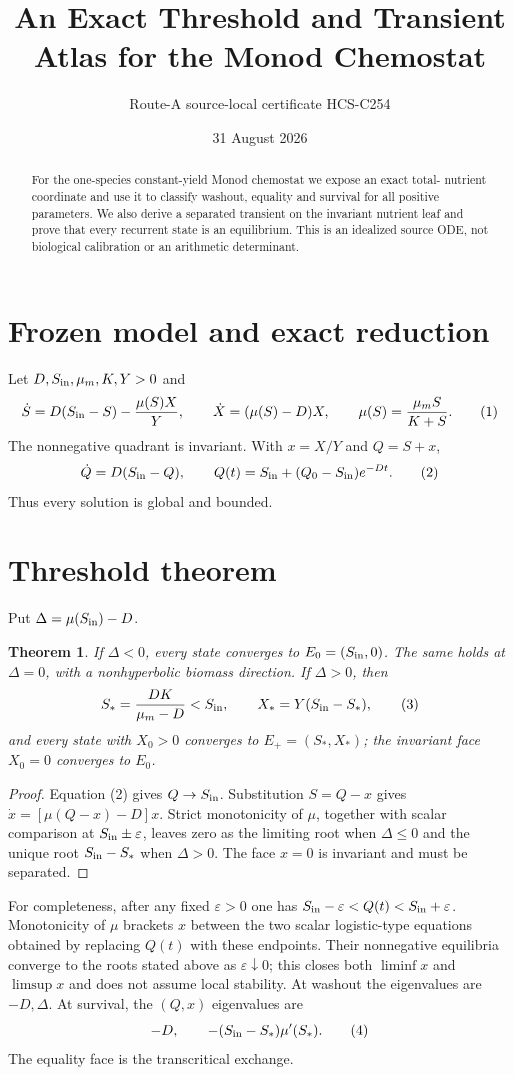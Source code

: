 \documentclass[10pt]{article}
\title{An Exact Threshold and Transient Atlas for the Monod Chemostat}
\author{Route-A source-local certificate HCS-C254}
\date{31 August 2026}
\newtheorem{theorem}{Theorem}
\begin{document}
\maketitle
\begin{abstract}
For the one-species constant-yield Monod chemostat we expose an exact total-
nutrient coordinate and use it to classify washout, equality and survival for
all positive parameters.  We also derive a separated transient on the
invariant nutrient leaf and prove that every recurrent state is an
equilibrium.  This is an idealized source ODE, not biological
calibration or an arithmetic determinant.
\end{abstract}
\section{Frozen model and exact reduction}
Let $D,S_{\rm in},\mu_m,K,Y>0$ and
\[
 \dot S=D(S_{\rm in}-S)-\frac{\mu(S)X}{Y},\qquad
 \dot X=(\mu(S)-D)X,\qquad \mu(S)=\frac{\mu_mS}{K+S}. \tag{1}
\]
The nonnegative quadrant is invariant.  With $x=X/Y$ and $Q=S+x$,
\[
 \dot Q=D(S_{\rm in}-Q),\qquad
 Q(t)=S_{\rm in}+(Q_0-S_{\rm in})e^{-Dt}. \tag{2}
\]
Thus every solution is global and bounded.
\section{Threshold theorem}
Put $\Delta=\mu(S_{\rm in})-D$.
\begin{theorem}
If $\Delta<0$, every state converges to
$E_0=(S_{\rm in},0)$.  The same holds at $\Delta=0$, with a nonhyperbolic
biomass direction.  If $\Delta>0$, then
\[
 S_*=\frac{DK}{\mu_m-D}<S_{\rm in},\qquad
 X_*=Y(S_{\rm in}-S_*), \tag{3}
\]
and every state with $X_0>0$ converges to $E_+=(S_*,X_*)$; the invariant
face $X_0=0$ converges to $E_0$.
\end{theorem}
\begin{proof}
Equation (2) gives $Q\to S_{\rm in}$.  Substitution $S=Q-x$ gives
$\dot x=[\mu(Q-x)-D]x$.  Strict monotonicity of $\mu$, together with scalar
comparison at $S_{\rm in}\pm\varepsilon$, leaves zero as the limiting root
when $\Delta\le0$ and the unique root $S_{\rm in}-S_*$ when $\Delta>0$.
The face $x=0$ is invariant and must be separated.
\end{proof}
For completeness, after any fixed $\varepsilon>0$ one has
$S_{\rm in}-\varepsilon<Q(t)<S_{\rm in}+\varepsilon$.  Monotonicity of
$\mu$ brackets $x$ between the two scalar logistic-type equations obtained by
replacing $Q(t)$ with these endpoints.  Their nonnegative equilibria converge
to the roots stated above as $\varepsilon\downarrow0$; this closes both
$\liminf x$ and $\limsup x$ and does not assume local stability.
At washout the eigenvalues are $-D,\Delta$.  At survival, the $(Q,x)$
eigenvalues are
\[
 -D,\qquad -(S_{\rm in}-S_*)\mu'(S_*). \tag{4}
\]
The equality face is the transcritical exchange.
\end{document}
